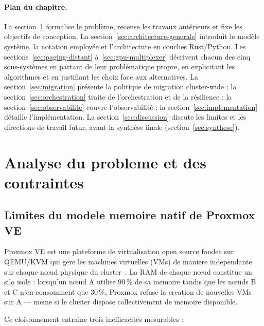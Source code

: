 \paragraph{Plan du chapitre.}
La section~\ref{sec:analyse-probleme} formalise le problème, recense les travaux antérieurs et fixe les objectifs de conception. La section~\ref{sec:architecture-generale} introduit le modèle système, la notation employée et l'architecture en couches Rust/Python. Les sections~\ref{sec:paging-distant} à~\ref{sec:gpu-multiplexer} décrivent chacun des cinq sous-systèmes en partant de leur problématique propre, en explicitant les algorithmes et en justifiant les choix face aux alternatives. La section~\ref{sec:migration} présente la politique de migration cluster-wide ; la section~\ref{sec:orchestration} traite de l'orchestration et de la résilience ; la section~\ref{sec:observabilite} couvre l'observabilité ; la section~\ref{sec:implementation} détaille l'implémentation. La section~\ref{sec:discussion} discute les limites et les directions de travail futur, avant la synthèse finale (section~\ref{sec:synthese}).

\section{Analyse du probleme et des contraintes}
\label{sec:analyse-probleme}

\subsection{Limites du modele memoire natif de Proxmox VE}
\label{subsec:limites-proxmox}

Proxmox VE est une plateforme de virtualisation open source fondee sur QEMU/KVM qui gere les machines virtuelles (VMs) de maniere independante sur chaque nœud physique du cluster~\cite{proxmox_doc,qemu_doc,kvm_doc}. La RAM de chaque nœud constitue un silo isole : lorsqu'un nœud A utilise 90\,\% de sa memoire tandis que les nœuds B et C n'en consomment que 30\,\%, Proxmox refuse la creation de nouvelles VMs sur A --- meme si le cluster dispose collectivement de memoire disponible.

Ce cloisonnement entraine trois inefficacites mesurables :

